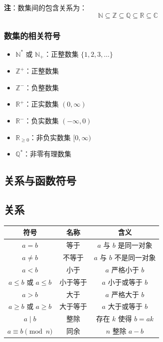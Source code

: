 \documentclass[12pt,a4paper,UTF8]{ctexart}
\begin{document}
\textbf{注}：数集间的包含关系为：
$$\mathbb{N} \subseteq \mathbb{Z} \subseteq \mathbb{Q} \subseteq \mathbb{R} \subseteq \mathbb{C}$$

\subsubsection{数集的相关符号}

\begin{itemize}
    \item $\mathbb{N}^*$ 或 $\mathbb{N}_+$：正整数集 $\{1,2,3,\dots\}$
    \item $\mathbb{Z}^+$：正整数集
    \item $\mathbb{Z}^-$：负整数集
    \item $\mathbb{R}^+$：正实数集 $(0, \infty)$
    \item $\mathbb{R}^-$：负实数集 $(-\infty, 0)$
    \item $\mathbb{R}_{\ge 0}$：非负实数集 $[0, \infty)$
    \item $\mathbb{Q}^*$：非零有理数集
\end{itemize}

\subsection{关系与函数符号}

\subsection{关系}

\begin{table}[ht]
\centering
\begin{tabular}{|c|c|c|}
\hline
符号 & 名称 & 含义 \\
\hline
$a = b$ & 等于 & $a$ 与 $b$ 是同一对象 \\
\hline
$a \neq b$ & 不等于 & $a$ 与 $b$ 不是同一对象 \\
\hline
$a < b$ & 小于 & $a$ 严格小于 $b$ \\
\hline
$a \le b$ 或 $a \leq b$ & 小于等于 & $a$ 小于或等于 $b$ \\
\hline
$a > b$ & 大于 & $a$ 严格大于 $b$ \\
\hline
$a \ge b$ 或 $a \geq b$ & 大于等于 & $a$ 大于或等于 $b$ \\
\hline
$a \mid b$ & 整除 & 存在 $k$ 使得 $b = ak$ \\
\hline
$a \equiv b \pmod{n}$ & 同余 & $n$ 整除 $a-b$ \\
\hline
\end{tabular}
\end{table}
\end{document}
